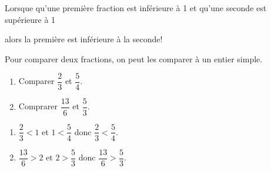 \begin{remarque}

    Lorsque qu'une première fraction est inférieure à 1 et qu'une seconde est supérieure à 1
    
    alors la première est inférieure à la seconde!
\end{remarque}

\begin{methode}
    Pour comparer deux fractions, on peut les comparer à un entier simple.
\exercice
\begin{enumerate}
    \item Comparer $\dfrac{2}{3}$ et $\dfrac{5}{4}$.
    \item Comprarer $\dfrac{13}{6}$ et $\dfrac{5}{3}$.
\end{enumerate}
\correction
\begin{enumerate}
    \item $\dfrac{2}{3}<1$ et $1<\dfrac{5}{4}$ donc $\dfrac{2}{3}<\dfrac{5}{4}$.
    \item $\dfrac{13}{6}>2$ et $2>\dfrac{5}{3}$ donc $\dfrac{13}{6}>\dfrac{5}{3}$.
\end{enumerate}
\end{methode}